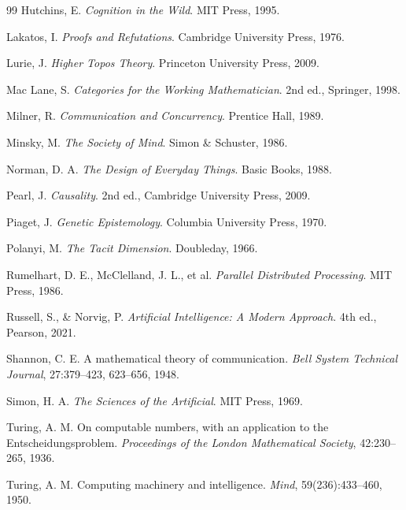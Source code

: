 \documentclass[12pt,oneside]{article}
\theoremstyle{remark}
\begin{document}
\begin{thebibliography}{99}
Hutchins, E.
\newblock \emph{Cognition in the Wild}.
\newblock MIT Press, 1995.

Lakatos, I.
\newblock \emph{Proofs and Refutations}.
\newblock Cambridge University Press, 1976.

Lurie, J.
\newblock \emph{Higher Topos Theory}.
\newblock Princeton University Press, 2009.

Mac Lane, S.
\newblock \emph{Categories for the Working Mathematician}.
\newblock 2nd ed., Springer, 1998.

Milner, R.
\newblock \emph{Communication and Concurrency}.
\newblock Prentice Hall, 1989.

Minsky, M.
\newblock \emph{The Society of Mind}.
\newblock Simon \& Schuster, 1986.

Norman, D. A.
\newblock \emph{The Design of Everyday Things}.
\newblock Basic Books, 1988.

Pearl, J.
\newblock \emph{Causality}.
\newblock 2nd ed., Cambridge University Press, 2009.

Piaget, J.
\newblock \emph{Genetic Epistemology}.
\newblock Columbia University Press, 1970.

Polanyi, M.
\newblock \emph{The Tacit Dimension}.
\newblock Doubleday, 1966.

Rumelhart, D. E., McClelland, J. L., et al.
\newblock \emph{Parallel Distributed Processing}.
\newblock MIT Press, 1986.

Russell, S., \& Norvig, P.
\newblock \emph{Artificial Intelligence: A Modern Approach}.
\newblock 4th ed., Pearson, 2021.

Shannon, C. E.
\newblock A mathematical theory of communication.
\newblock \emph{Bell System Technical Journal}, 27:379--423, 623--656, 1948.

Simon, H. A.
\newblock \emph{The Sciences of the Artificial}.
\newblock MIT Press, 1969.

Turing, A. M.
\newblock On computable numbers, with an application to the Entscheidungsproblem.
\newblock \emph{Proceedings of the London Mathematical Society}, 42:230--265, 1936.

Turing, A. M.
\newblock Computing machinery and intelligence.
\newblock \emph{Mind}, 59(236):433--460, 1950.


\end{thebibliography}
\end{document}
